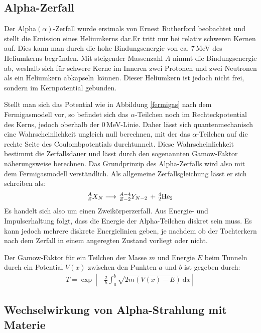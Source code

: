 \subsection{Alpha-Zerfall}

Der Alpha$\left( \alpha\right) $-Zerfall wurde erstmals von Ernest Rutherford beobachtet und stellt die Emission eines Heliumkerns dar.Er tritt nur bei relativ schweren Kernen auf. Dies kann man durch die hohe Bindungsenergie von ca. 7\,MeV des Heliumkerns begründen. Mit steigender Massenzahl $A$ nimmt die Bindungsenergie ab, weshalb sich für schwere Kerne im Inneren zwei Protonen und zwei Neutronen als ein Heliumkern \glqq abkapseln\grqq\ können. Dieser Heliumkern ist jedoch nicht frei, sondern im Kernpotential gebunden. 

\noindent Stellt man sich das Potential wie in Abbildung \ref{fermigas} nach dem Fermigasmodell vor, so befindet sich das $\alpha$-Teilchen noch im Rechteckpotential des Kerns, jedoch oberhalb der 0\,MeV-Linie. Daher lässt sich quantenmechanisch eine Wahrscheinlichkeit ungleich null berechnen, mit der das $\alpha$-Teilchen auf die rechte Seite des Coulombpotentials durchtunnelt. Diese Wahrscheinlichkeit bestimmt die Zerfallsdauer und lässt durch den sogenannten Gamow-Faktor näherungsweise berechnen. Das Grundprinzip des Alpha-Zerfalls wird also mit dem Fermigasmodell verständlich. Als allgemeine Zerfallsgleichung lässt er sich schreiben als:
\begin{align*}
^A_ZX_N\longrightarrow \,^{A-4}_{Z-2}Y_{N-2} \,+ \,^4_2\textnormal{He}_2
\end{align*}
Es handelt sich also um einen Zweikörperzerfall. Aus Energie- und Impulserhaltung folgt, dass die Energie der Alpha-Teilchen diskret sein muss. Es kann jedoch mehrere diskrete Energielinien geben, je nachdem ob der Tochterkern nach dem Zerfall in einem angeregten Zustand vorliegt oder nicht. 

Der Gamow-Faktor für ein Teilchen der Masse $m$ und Energie $E$ beim Tunneln durch ein Potential $V(x)$ zwischen den Punkten $a$ und $b$ ist gegeben durch:
\begin{align}
	T=\exp\left[ -\frac{2}{\hbar}\int_{a}^{b}\sqrt{2m\left( V(x)-E\right) }\,\text{d}x\right] 
\end{align}

\subsection{Wechselwirkung von Alpha-Strahlung mit Materie}

